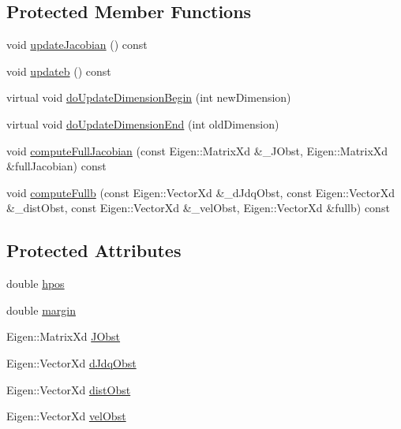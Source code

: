 \subsection*{Protected Member Functions}
\begin{DoxyCompactItemize}
\item 
void \hyperlink{classocra_1_1ContactAvoidanceFunction_a1351367f60f935b7178d1d2e752293bc}{update\+Jacobian} () const 
\item 
void \hyperlink{classocra_1_1ContactAvoidanceFunction_a855a318b47bb7ac163cc482ba24fe6f9}{updateb} () const 
\item 
virtual void \hyperlink{classocra_1_1ContactAvoidanceFunction_a4f33ca5589b08a96207be800b9f4bd57}{do\+Update\+Dimension\+Begin} (int new\+Dimension)
\item 
virtual void \hyperlink{classocra_1_1ContactAvoidanceFunction_ad81a7b03b0fb7e8b2a037bccf5faea84}{do\+Update\+Dimension\+End} (int old\+Dimension)
\item 
void \hyperlink{classocra_1_1ContactAvoidanceFunction_a8a9b3979fd9fde89c2bc7c9fc72dd8b8}{compute\+Full\+Jacobian} (const Eigen\+::\+Matrix\+Xd \&\+\_\+\+J\+Obst, Eigen\+::\+Matrix\+Xd \&full\+Jacobian) const 
\item 
void \hyperlink{classocra_1_1ContactAvoidanceFunction_a726154874ea2841eedbb115474e71014}{compute\+Fullb} (const Eigen\+::\+Vector\+Xd \&\+\_\+d\+Jdq\+Obst, const Eigen\+::\+Vector\+Xd \&\+\_\+dist\+Obst, const Eigen\+::\+Vector\+Xd \&\+\_\+vel\+Obst, Eigen\+::\+Vector\+Xd \&fullb) const 
\end{DoxyCompactItemize}
\subsection*{Protected Attributes}
\begin{DoxyCompactItemize}
\item 
double \hyperlink{classocra_1_1ContactAvoidanceFunction_a49e94dae2d7708e66cf11e737b1a4d6d}{hpos}
\item 
double \hyperlink{classocra_1_1ContactAvoidanceFunction_a5a4c2e4dae17aef6c4cf6fa1b3be093e}{margin}
\item 
Eigen\+::\+Matrix\+Xd \hyperlink{classocra_1_1ContactAvoidanceFunction_a233c509632182b45540a30b818254713}{J\+Obst}
\item 
Eigen\+::\+Vector\+Xd \hyperlink{classocra_1_1ContactAvoidanceFunction_a59c655299c8db310d3e06a47729f0780}{d\+Jdq\+Obst}
\item 
Eigen\+::\+Vector\+Xd \hyperlink{classocra_1_1ContactAvoidanceFunction_aa3d1b5f23d42c0936b1fa09ad7988732}{dist\+Obst}
\item 
Eigen\+::\+Vector\+Xd \hyperlink{classocra_1_1ContactAvoidanceFunction_a19eb96ace3a217e5ea1c80dec97eeeb2}{vel\+Obst}
\end{DoxyCompactItemize}
